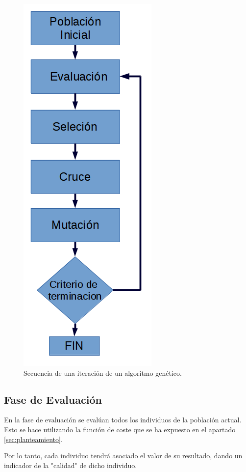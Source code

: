\documentclass[10pt,a4paper]{article}
\begin{document}
\begin{figure}[h]
\centering
\includegraphics[scale=0.4]{GaIteration.png} 
\caption{Secuencia de una iteración de un algoritmo genético.}
\label{fig:gaIteration}
\end{figure}



\subsection{Fase de Evaluación}
En la fase de evaluación se evalúan todos los individuos de la población actual. Esto se hace utilizando la función de coste que se ha expuesto en el apartado \ref{sec:planteamiento}.

Por lo tanto, cada individuo tendrá asociado el valor de su resultado, dando un indicador de la "calidad" de dicho individuo.
\end{document}
